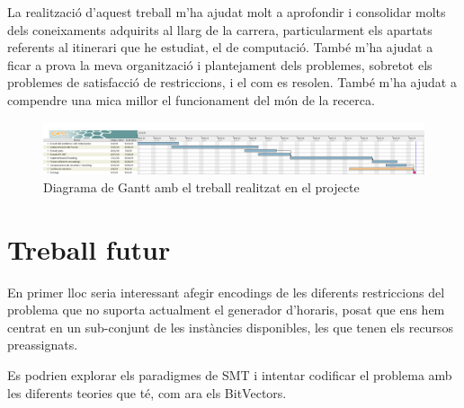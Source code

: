 \documentclass[11pt,a4paper,twoside]{report}
\begin{document}
  La realització d'aquest treball m'ha ajudat molt a aprofondir i consolidar molts dels coneixaments adquirits al llarg de la carrera, particularment els apartats referents al itinerari que he estudiat, el de computació. 
  També m'ha ajudat a ficar a prova la meva organització i plantejament dels problemes, sobretot els problemes de satisfacció de restriccions, i el com es resolen. 
  També m'ha ajudat a compendre una mica millor el funcionament del món de la recerca. 


  \begin{figure}
    \centering
    \includegraphics[angle=90,origin=c,height=0.58\textheight]{Diagrames/gantt2.png} 
    \caption{Diagrama de Gantt amb el treball realitzat en el projecte}
    \label{fig:Gantt2}
  \end{figure}




  
  





  \chapter{Treball futur}

  En primer lloc seria interessant afegir encodings de les diferents restriccions del problema que no suporta actualment el generador d'horaris, posat que ens hem centrat en un sub-conjunt de les instàncies disponibles, les que tenen els recursos preassignats.

  Es podrien explorar els paradigmes de SMT i intentar codificar el problema amb les diferents teories que té, com ara els BitVectors.
\end{document}

